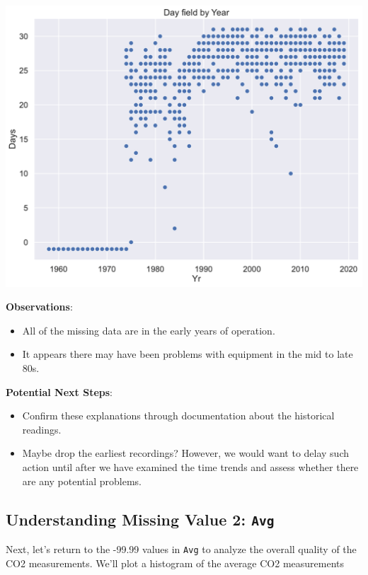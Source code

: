 \documentclass[
  letterpaper,
  DIV=11,
  numbers=noendperiod]{scrreprt}
\providecommand{\tightlist}{%
  \setlength{\itemsep}{0pt}\setlength{\parskip}{0pt}}\usepackage{longtable,booktabs,array}
\begin{document}
\includegraphics{eda/eda_files/figure-pdf/cell-68-output-1.pdf}

\textbf{Observations}:

\begin{itemize}
\tightlist
\item
  All of the missing data are in the early years of operation.
\item
  It appears there may have been problems with equipment in the mid to
  late 80s.
\end{itemize}

\textbf{Potential Next Steps}:

\begin{itemize}
\tightlist
\item
  Confirm these explanations through documentation about the historical
  readings.
\item
  Maybe drop the earliest recordings? However, we would want to delay
  such action until after we have examined the time trends and assess
  whether there are any potential problems.
\end{itemize}

\subsection{\texorpdfstring{Understanding Missing Value 2:
\texttt{Avg}}{Understanding Missing Value 2: Avg}}\label{understanding-missing-value-2-avg}

Next, let's return to the -99.99 values in \texttt{Avg} to analyze the
overall quality of the CO2 measurements. We'll plot a histogram of the
average CO2 measurements
\end{document}
